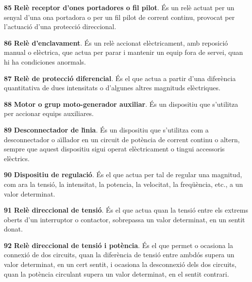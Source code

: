 \begin{multicols}{2}
\begin{list}{}
\item[\textbf{85}]  \textbf{Rel\`{e}
receptor d'ones portadores o fil pilot}. \'{E}s un rel\`{e} actuat per un
senyal d'una ona portadora o per un fil pilot de corrent continu, provocat
per l'actuaci\'{o} d'una protecci\'{o} direccional.

\item[\textbf{86}]  \textbf{Rel\`{e} d'enclavament}. \'{E}s un rel\`{e}
accionat el\`{e}ctricament, amb reposici\'{o} manual o el\`{e}ctrica, que actua
per parar i mantenir un equip fora de servei, quan hi ha condiciones
anormals.

\item[\textbf{87}]  \textbf{Rel\`{e} de protecci\'{o}
diferencial}. \'{E}s el que actua a partir d'una  difer\`{e}ncia quantitativa de dues intensitats
o d'algunes altres magnituds el\`{e}ctriques.

\item[\textbf{88}]  \textbf{Motor o grup
moto-generador auxiliar}. \'{E}s un dispositiu que s'utilitza per
accionar equips auxiliares.

\item[\textbf{89}]  \textbf{Desconnectador de l\'{\i}nia}. \'{E}s
un dispositiu que s'utilitza com a desconnectador o a\"{\i}llador en un
circuit de pot\`{e}ncia de corrent continu o altern, sempre que aquest
dispositiu sigui operat el\`{e}ctricament o tingui accessoris el\`{e}ctrics.

\item[\textbf{90}]  \textbf{Dispositiu de regulaci\'{o}}. \'{E}s el que
actua per tal de regular una magnitud, com ara la tensi\'{o}, la intensitat, la potencia,
la velocitat, la freq\"{u}\`{e}ncia, etc., a un valor determinat.

\item[\textbf{91}]  \textbf{Rel\`{e} direccional de tensi\'{o}}.
\'{E}s el que actua quan la tensi\'{o} entre els extrems oberts d'un
interruptor o contactor, sobrepassa un valor determinat, en un
sentit donat.

\item[\textbf{92}]  \textbf{Rel\`{e} direccional
de tensi\'{o} i pot\`{e}ncia}. \'{E}s el que permet o ocasiona la connexi\'{o} de
dos circuits, quan la difer\`{e}ncia de tensi\'{o} entre ambd\'{o}s supera un
valor determinat, en un cert sentit, i ocasiona la desconnexi\'{o} dels
dos circuits, quan la pot\`{e}ncia circulant supera un valor determinat,
en el sentit contrari.


\end{list}
\end{multicols}

